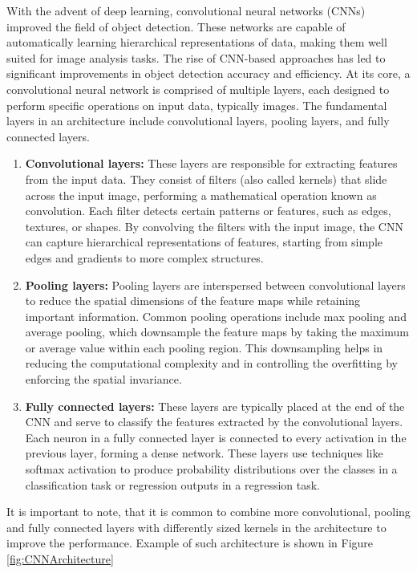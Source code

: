 With the advent of deep learning, convolutional neural networks (CNNs) improved the field of object detection. These
networks are
capable of automatically learning hierarchical representations of data, making them well suited for image analysis
tasks. The rise of CNN-based approaches has led to significant improvements in object detection accuracy and efficiency.
At its core, a convolutional neural network is comprised of multiple layers, each designed to perform specific
operations on input data, typically images. The fundamental layers in an architecture include convolutional layers,
pooling layers, and fully connected layers.
\begin{enumerate}
  \item \textbf{Convolutional layers:} These layers are responsible for extracting features from the input data. They consist of filters (also called kernels) that slide across the input image, performing a mathematical operation known as convolution. Each filter detects certain patterns or features, such as edges, textures, or shapes. By convolving the filters with the input image, the CNN can capture hierarchical representations of features, starting from simple edges and gradients to more complex structures.
  \item \textbf{Pooling layers:} Pooling layers are interspersed between convolutional layers to reduce the spatial dimensions of the feature maps while retaining important information. Common pooling operations include max pooling and average pooling, which downsample the feature maps by taking the maximum or average value within each pooling region. This downsampling helps in reducing the computational complexity and in controlling the overfitting by enforcing the spatial invariance.
  \item \textbf{Fully connected layers:} These layers are typically placed at the end of the CNN and serve to classify the features extracted by the convolutional layers. Each neuron in a fully connected layer is connected to every activation in the previous layer, forming a dense network. These layers use techniques like softmax activation to produce probability distributions over the classes in a classification task or regression outputs in a regression task.
\end{enumerate}
It is important to note, that it is common to combine more convolutional, pooling and fully connected layers with differently sized kernels in the architecture to improve the performance. Example of such architecture is shown in Figure \ref{fig:CNNArchitecture}
